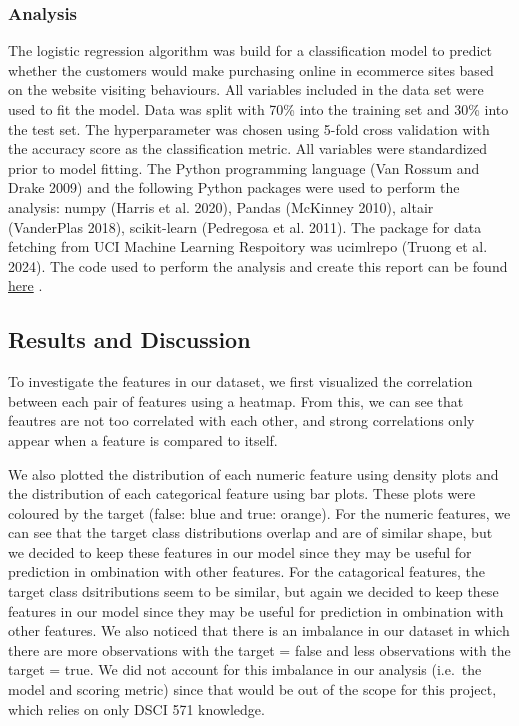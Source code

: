 \documentclass[
  letterpaper,
  DIV=11,
  numbers=noendperiod]{scrartcl}
\begin{document}
\subsubsection{Analysis}\label{analysis}

The logistic regression algorithm was build for a classification model
to predict whether the customers would make purchasing online in
ecommerce sites based on the website visiting behaviours. All variables
included in the data set were used to fit the model. Data was split with
70\% into the training set and 30\% into the test set. The
hyperparameter was chosen using 5-fold cross validation with the
accuracy score as the classification metric. All variables were
standardized prior to model fitting. The Python programming language
(Van Rossum and Drake 2009) and the following Python packages were used
to perform the analysis: numpy (Harris et al. 2020), Pandas (McKinney
2010), altair (VanderPlas 2018), scikit-learn (Pedregosa et al. 2011).
The package for data fetching from UCI Machine Learning Respoitory was
ucimlrepo (Truong et al. 2024). The code used to perform the analysis
and create this report can be found
\href{https://github.com/UBC-MDS/Online-Shoppers-Purchasing-Intention-Prediction}{here}
.

\subsection{Results and Discussion}\label{results-and-discussion}

To investigate the features in our dataset, we first visualized the
correlation between each pair of features using a heatmap. From this, we
can see that feautres are not too correlated with each other, and strong
correlations only appear when a feature is compared to itself.

We also plotted the distribution of each numeric feature using density
plots and the distribution of each categorical feature using bar plots.
These plots were coloured by the target (false: blue and true: orange).
For the numeric features, we can see that the target class distributions
overlap and are of similar shape, but we decided to keep these features
in our model since they may be useful for prediction in ombination with
other features. For the catagorical features, the target class
dsitributions seem to be similar, but again we decided to keep these
features in our model since they may be useful for prediction in
ombination with other features. We also noticed that there is an
imbalance in our dataset in which there are more observations with the
target = false and less observations with the target = true. We did not
account for this imbalance in our analysis (i.e.~the model and scoring
metric) since that would be out of the scope for this project, which
relies on only DSCI 571 knowledge.
\end{document}
